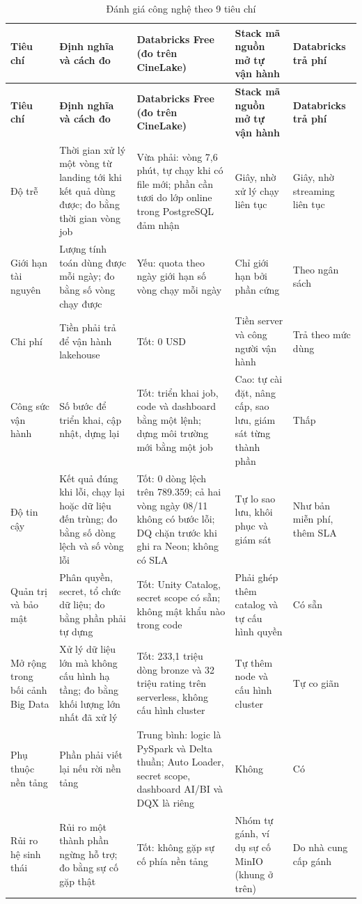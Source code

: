 \documentclass[a4paper,11pt]{article}
\newlength{\reporttablewidth}
\begin{document}
\begingroup
\footnotesize
{}
\setlength{\tabcolsep}{4pt}
\renewcommand{\arraystretch}{1.18}
\setlength{\reporttablewidth}{\dimexpr\linewidth-8\tabcolsep\relax}
\begin{longtable}{@{}L{0.16\reporttablewidth} L{0.22\reporttablewidth} L{0.23\reporttablewidth} L{0.24\reporttablewidth} L{0.15\reporttablewidth}@{}}
\caption[Đánh giá công nghệ theo 9 tiêu chí (mục 5.5)]{Đánh giá công nghệ theo 9 tiêu chí}\label{tab:21} \\
\toprule
\textbf{Tiêu chí} & \textbf{Định nghĩa và cách đo} & \textbf{Databricks Free (đo trên CineLake)} & \textbf{Stack mã nguồn mở tự vận hành} & \textbf{Databricks trả phí} \\
\midrule
\endfirsthead
\toprule
\textbf{Tiêu chí} & \textbf{Định nghĩa và cách đo} & \textbf{Databricks Free (đo trên CineLake)} & \textbf{Stack mã nguồn mở tự vận hành} & \textbf{Databricks trả phí} \\
\midrule
\endhead
\midrule
\endfoot
\bottomrule
\endlastfoot
Độ trễ & Thời gian xử lý một vòng từ landing tới khi kết quả dùng được; đo bằng thời gian vòng job & Vừa phải: vòng 7,6 phút, tự chạy khi có file mới; phần cần tươi do lớp online trong PostgreSQL đảm nhận & Giây, nhờ xử lý chạy liên tục & Giây, nhờ streaming liên tục \\
Giới hạn tài nguyên & Lượng tính toán dùng được mỗi ngày; đo bằng số vòng chạy được & Yếu: quota theo ngày giới hạn số vòng chạy mỗi ngày & Chỉ giới hạn bởi phần cứng & Theo ngân sách \\
Chi phí & Tiền phải trả để vận hành lakehouse & Tốt: 0 USD & Tiền server và công người vận hành & Trả theo mức dùng \\
Công sức vận hành & Số bước để triển khai, cập nhật, dựng lại & Tốt: triển khai job, code và dashboard bằng một lệnh; dựng môi trường mới bằng một job & Cao: tự cài đặt, nâng cấp, sao lưu, giám sát từng thành phần & Thấp \\
Độ tin cậy & Kết quả đúng khi lỗi, chạy lại hoặc dữ liệu đến trùng; đo bằng số dòng lệch và số vòng lỗi & Tốt: 0 dòng lệch trên 789.359; cả hai vòng ngày 08/11 không có bước lỗi; DQ chặn trước khi ghi ra Neon; không có SLA & Tự lo sao lưu, khôi phục và giám sát & Như bản miễn phí, thêm SLA \\
Quản trị và bảo mật & Phân quyền, secret, tổ chức dữ liệu; đo bằng phần phải tự dựng & Tốt: Unity Catalog, secret scope có sẵn; không mật khẩu nào trong code & Phải ghép thêm catalog và tự cấu hình quyền & Có sẵn \\
Mở rộng trong bối cảnh Big Data & Xử lý dữ liệu lớn mà không cấu hình hạ tầng; đo bằng khối lượng lớn nhất đã xử lý & Tốt: 233,1 triệu dòng bronze và 32 triệu rating trên serverless, không cấu hình cluster & Tự thêm node và cấu hình cluster & Tự co giãn \\
Phụ thuộc nền tảng & Phần phải viết lại nếu rời nền tảng & Trung bình: logic là PySpark và Delta thuần; Auto Loader, secret scope, dashboard AI/BI và DQX là riêng & Không & Có \\
Rủi ro hệ sinh thái & Rủi ro một thành phần ngừng hỗ trợ; đo bằng sự cố gặp thật & Tốt: không gặp sự cố phía nền tảng & Nhóm tự gánh, ví dụ sự cố MinIO (khung ở trên) & Do nhà cung cấp gánh \\
\end{longtable}
\end{document}
